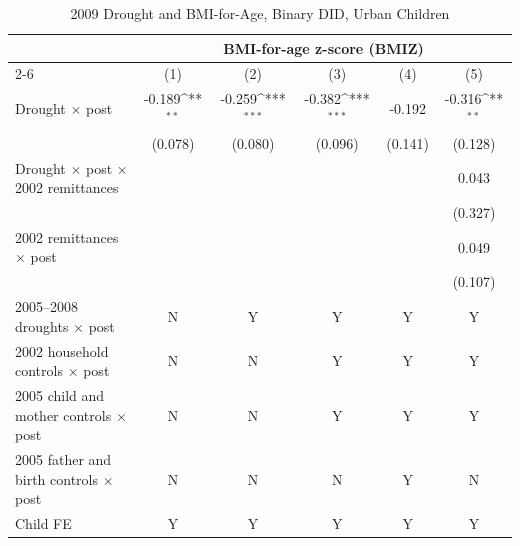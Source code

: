 \documentclass[12pt]{article}
\def\sym#1{\ifmmode^{#1}\else\(^{#1}\)\fi}
\begin{document}
\begin{longtable}{l*{5}{c}}
\caption{2009 Drought and BMI-for-Age, Binary DID, Urban Children}\\
\toprule
 & \multicolumn{5}{c}{BMI-for-age z-score (BMIZ)}\\
\cmidrule(lr){2-6}
            &\multicolumn{1}{c}{(1)}         &\multicolumn{1}{c}{(2)}         &\multicolumn{1}{c}{(3)}         &\multicolumn{1}{c}{(4)}         &\multicolumn{1}{c}{(5)}         \\
\midrule
Drought \ensuremath{\times} post&      -0.189\sym{**} &      -0.259\sym{***}&      -0.382\sym{***}&      -0.192         &      -0.316\sym{**} \\
            &     (0.078)         &     (0.080)         &     (0.096)         &     (0.141)         &     (0.128)         \\
Drought \ensuremath{\times} post \ensuremath{\times} 2002 remittances&                     &                     &                     &                     &       0.043         \\
            &                     &                     &                     &                     &     (0.327)         \\
2002 remittances \ensuremath{\times} post&                     &                     &                     &                     &       0.049         \\
            &                     &                     &                     &                     &     (0.107)         \\
\midrule
2005--2008 droughts \ensuremath{\times} post&           N         &           Y         &           Y         &           Y         &           Y         \\
2002 household controls \ensuremath{\times} post&           N         &           N         &           Y         &           Y         &           Y         \\
2005 child and mother controls \ensuremath{\times} post&           N         &           N         &           Y         &           Y         &           Y         \\
2005 father and birth controls \ensuremath{\times} post&           N         &           N         &           N         &           Y         &           N         \\
Child FE    &           Y         &           Y         &           Y         &           Y         &           Y         \\

\end{longtable}
\end{document}
